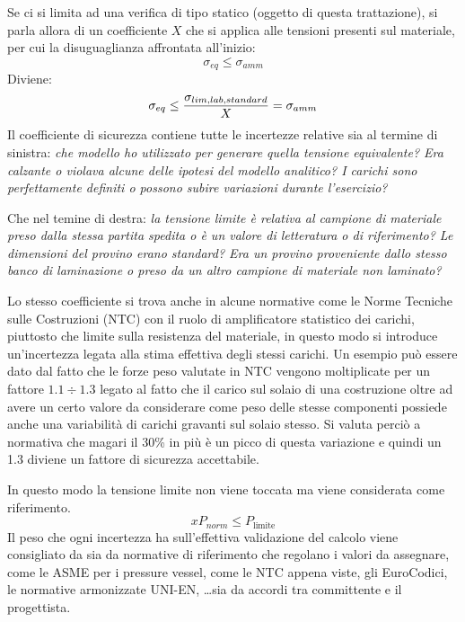 \documentclass{article}
\begin{document}
\begin{adjustwidth}{2in}{}
	    Se ci si limita ad una verifica di tipo statico (oggetto di questa trattazione), si parla allora di un coefficiente $ X $ che si applica alle tensioni presenti sul materiale, per cui la disuguaglianza affrontata all'inizio:
	    \[\sigma_{eq}\leq\sigma_{amm}\]
	    Diviene: 
	    \[\sigma_{eq}\leq{\sigma_{lim, lab, standard}\over X} = \sigma_{amm}\]
	    Il coefficiente di sicurezza contiene tutte le incertezze relative sia al termine di sinistra: \textit{che modello ho utilizzato per generare quella tensione equivalente? Era calzante o violava alcune delle ipotesi del modello analitico? I carichi sono perfettamente definiti o possono subire variazioni durante l'esercizio? }
	    
	    Che nel temine di destra: \textit{la tensione limite è relativa al campione di materiale preso dalla stessa partita spedita o è un valore di letteratura o di riferimento? Le dimensioni del provino erano standard? Era un provino proveniente dallo stesso banco di laminazione o preso da un altro campione di materiale non laminato? } \newline
	    
	    Lo stesso coefficiente si trova anche in alcune normative come le Norme Tecniche sulle Costruzioni (NTC) con il ruolo di amplificatore statistico dei carichi, piuttosto che limite sulla resistenza del materiale, in questo modo si introduce un'incertezza legata alla stima effettiva degli stessi carichi. Un esempio può essere dato dal fatto che le forze peso valutate in NTC vengono moltiplicate per un fattore $ 1.1\div1.3 $ legato al fatto che il carico sul solaio di una costruzione oltre ad avere un certo valore da considerare come peso delle stesse componenti possiede anche una variabilità di carichi gravanti sul solaio stesso. Si valuta perciò a normativa che magari il 30\% in più è un picco di questa variazione e quindi un 1.3 diviene un fattore di sicurezza accettabile.
	    
	    In questo modo la tensione limite non viene toccata ma viene considerata come riferimento. 
	    \[xP_{norm}\leq P_{\text{limite}}\]
\newpage
	    Il peso che ogni incertezza ha sull'effettiva validazione del calcolo viene consigliato da sia da normative di riferimento che regolano i valori da assegnare, come le ASME per i pressure vessel, come le NTC appena viste, gli EuroCodici, le normative armonizzate UNI-EN, \dots sia da accordi tra committente e il progettista.\newline
	    

\end{adjustwidth}
\end{document}
